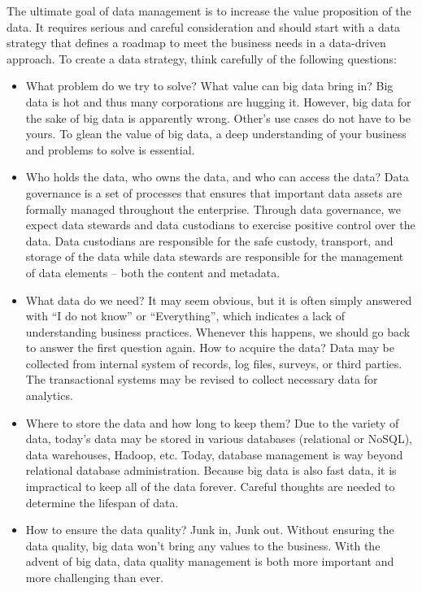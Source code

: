 \documentclass[12pt]{book}
\begin{document}
The ultimate goal of data management is to increase the value proposition of the data. It requires serious and careful consideration and should start with a data strategy that defines a roadmap to meet the business needs in a data-driven approach. To create a data strategy, think carefully of the following questions:
\begin{itemize}
\item What problem do we try to solve? What value can big data bring in? Big data is hot and thus many corporations are hugging it. However, big data for the sake of big data is apparently wrong. Other's use cases do not have to be yours. To glean the value of big data, a deep understanding of your business and problems to solve is essential.
\item Who holds the data, who owns the data, and who can access the data? Data governance is a set of processes that ensures that important data assets are formally managed throughout the enterprise. Through data governance, we expect data stewards and data custodians to exercise positive control over the data. Data custodians are responsible for the safe custody, transport, and storage of the data while data stewards are responsible for the management of data elements -- both the content and metadata.
\item What data do we need? It may seem obvious, but it is often simply answered with ``I do not know'' or ``Everything'', which indicates a lack of understanding business practices. Whenever this happens, we should go back to answer the first question again. How to acquire the data? Data may be collected from internal system of records, log files, surveys, or third parties. The transactional systems may be revised to collect necessary data for analytics.
\item Where to store the data and how long to keep them? Due to the variety of data, today's data may be stored in various databases (relational or NoSQL), data warehouses, Hadoop, etc. Today, database management is way beyond relational database administration. Because big data is also fast data, it is impractical to keep all of the data forever. Careful thoughts are needed to determine the lifespan of data.
\item How to ensure the data quality? Junk in, Junk out. Without ensuring the data quality, big data won't bring any values to the business. With the advent of big data, data quality management is both more important and more challenging than ever. 

\end{itemize}
\end{document}
